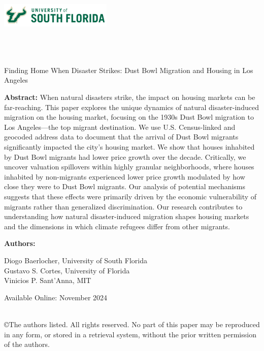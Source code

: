 \documentclass[11pt]{article}
\begin{document}
\onehalfspacing

\noindent \includegraphics[width = 0.4\textwidth]{USouthFlorida-lightbg-2c-rgb-h.png} \\

\noindent{\color{usfgreen} \rule{0.5\textwidth}{10pt}}{\color{usfgold} \rule{0.5\textwidth}{10pt}}\\

 \\
 \\

\vspace*{0.5in}

\begin{center} 
    \huge Finding Home When Disaster Strikes: Dust Bowl Migration and Housing in Los Angeles
\end{center}

\vspace*{0.5in}

\noindent \textbf{Abstract:} When natural disasters strike, the impact on housing markets can be far-reaching. This paper explores the unique dynamics of natural disaster-induced migration on the housing market, focusing on the 1930s Dust Bowl migration to Los Angeles---the top migrant destination. We use U.S. Census-linked and geocoded address data to document that the arrival of Dust Bowl migrants significantly impacted the city's housing market. We show that houses inhabited by Dust Bowl migrants had lower price growth over the decade. Critically, we uncover valuation spillovers within highly granular neighborhoods, where houses inhabited by non-migrants experienced lower price growth modulated by how close they were to Dust Bowl migrants. Our analysis of potential mechanisms suggests that these effects were primarily driven by the economic vulnerability of migrants rather than generalized discrimination. Our research contributes to understanding how natural disaster-induced migration shapes housing markets and the dimensions in which climate refugees differ from other migrants.

\vspace*{0.25in}

\noindent \textbf{Authors:}

Diogo Baerlocher, University of South Florida \\
\indent Gustavo S. Cortes, University of Florida \\
\indent Vinicios P. Sant'Anna, MIT \\

\vspace*{0.25in}


\noindent Available Online: November 2024 %

\vfill 
\noindent{\color{usfgreen} \rule{\textwidth}{5pt}}\\
\noindent \small ©The authors listed. All rights reserved. No part of this paper may be reproduced in any form, or stored in a retrieval system, without the prior written permission of the authors.
\thispagestyle{empty}
\end{document}
